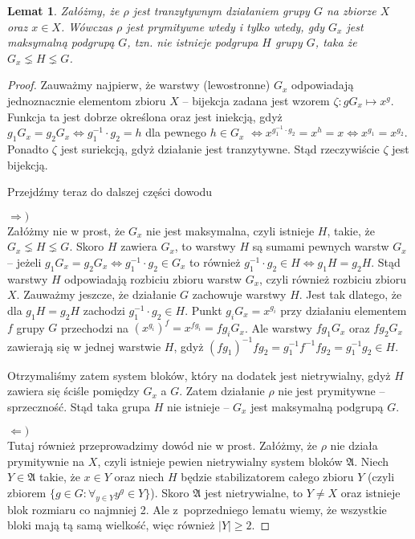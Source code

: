 \documentclass[licencjacka]{pracamgr}
\newtheorem{lemma}{Lemat}[section]
\begin{document}
\begin{lemma}\label{max_group}
	Załóżmy, że $\rho$ jest tranzytywnym działaniem grupy $G$ na zbiorze $X$ oraz $x \in X$.
	Wówczas $\rho$ jest prymitywne wtedy i tylko wtedy, gdy $G_x$ jest maksymalną podgrupą $G$, tzn.
	nie istnieje podgrupa $H$ grupy $G$, taka że $G_x \lneq H \lneq G$.
\end{lemma}
\begin{proof}
Zauważmy najpierw, że warstwy (lewostronne) $G_x$ odpowiadają jednoznacznie elementom zbioru $X$ --
bijekcja zadana jest wzorem $\zeta \colon g G_x \mapsto x^g$.
Funkcja ta jest dobrze określona oraz jest iniekcją, gdyż $g_1 G_x = g_2 G_x \iff g_1^{-1} \cdot g_2 = h$ dla pewnego $h \in G_x$
$\iff x^{g_1^{-1} \cdot g_2} = x^h = x \iff x^{g_1} = x^{g_2}$.
Ponadto $\zeta$ jest suriekcją, gdyż działanie jest tranzytywne.
Stąd rzeczywiście $\zeta$ jest bijekcją.

Przejdźmy teraz do dalszej części dowodu

$\Rightarrow)$ \\
Załóżmy nie w prost, że $G_x$ nie jest maksymalna, czyli istnieje $H$, takie, że $G_x \lneq H \lneq G$.
Skoro $H$ zawiera $G_x$, to warstwy $H$ są sumami pewnych warstw $G_x$ -- 
jeżeli $g_1 G_x = g_2 G_x \iff g_1^{-1} \cdot g_2 \in G_x$ to również $g_1^{-1} \cdot g_2 \in H \iff g_1 H = g_2 H$.
Stąd warstwy $H$ odpowiadają rozbiciu zbioru warstw $G_x$, czyli również rozbiciu zbioru $X$.
Zauważmy jeszcze, że działanie $G$ zachowuje warstwy $H$.
Jest tak dlatego, że dla $g_1 H = g_2 H$ zachodzi $g_1^{-1} \cdot g_2 \in H$.
Punkt $g_i G_x = x^{g_i}$ przy działaniu elementem $f$ grupy $G$ przechodzi na $(x^{g_i})^f = x^{f g_i} = f g_i G_x$.
Ale warstwy $f g_1 G_x$ oraz $f g_2 G_x$ zawierają się w jednej warstwie $H$, gdyż $(f g_1)^{-1} f g_2 = g_1^{-1} f^{-1} f g_2 = g_1^{-1} g_2 \in H$.

Otrzymaliśmy zatem system bloków, który na dodatek jest nietrywialny, gdyż $H$ zawiera się ściśle pomiędzy $G_x$ a $G$.
Zatem działanie $\rho$ nie jest prymitywne -- sprzeczność.
Stąd taka grupa $H$ nie istnieje -- $G_x$ jest maksymalną podgrupą $G$.

$\Leftarrow)$ \\
Tutaj również przeprowadzimy dowód nie w prost.
Załóżmy, że $\rho$ nie działa prymitywnie na $X$, czyli istnieje pewien nietrywialny system bloków $\mathfrak{A}$.
Niech $Y \in \mathfrak{A}$ takie, że $x \in Y$ oraz niech $H$ będzie stabilizatorem całego zbioru $Y$
(czyli zbiorem $\{g \in G \colon \forall_{y \in Y} y^g \in Y \}$).
Skoro $\mathfrak{A}$ jest nietrywialne, to $Y \ne X$ oraz istnieje blok rozmiaru co najmniej 2.
Ale z~poprzedniego lematu wiemy, że wszystkie bloki mają tą samą wielkość, więc również $|Y| \ge 2$.


\end{proof}
\end{document}
